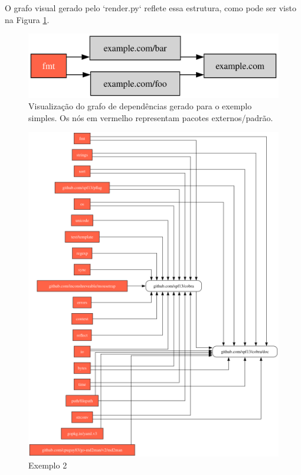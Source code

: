 \documentclass[12pt]{article}
\begin{document}
O grafo visual gerado pelo `render.py` reflete essa estrutura, como pode ser visto na Figura \ref{fig:grafoExemplo}.

\begin{figure}[ht]
\centering
\includegraphics[width=1\textwidth]{examples/example.com.png}
\caption{Visualização do grafo de dependências gerado para o exemplo simples. Os nós em vermelho representam pacotes externos/padrão.}
\label{fig:grafoExemplo}
\end{figure}

\begin{figure}[ht]
\centering
\includegraphics[width=1\textwidth]{examples/github.com_spf13_cobra.png}
\caption{Exemplo 2}
\label{fig:exemplo-2}
\end{figure}
\end{document}
